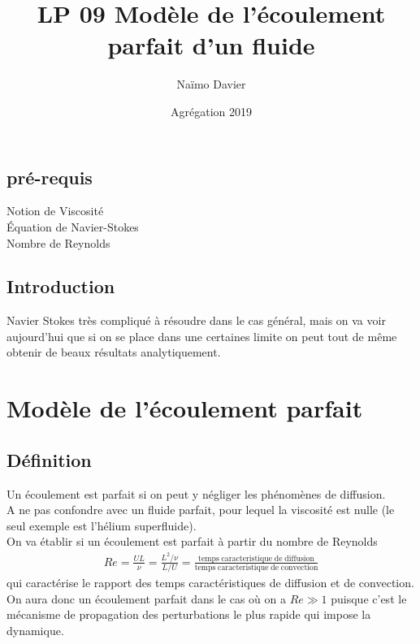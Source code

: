 \documentclass[12pt,prb,aps,epsf]{article}
\begin{document}
	
	\title{LP 09 Modèle de l'écoulement parfait d'un fluide}
	\author{Naïmo Davier}
	\date{Agrégation 2019}
	
	\maketitle
	
	\tableofcontents
	
	\pagebreak
	
	
\subsection{pré-requis}
Notion de Viscosité\\
Équation de Navier-Stokes\\
Nombre de Reynolds

\subsection{Introduction}
Navier Stokes très compliqué à résoudre dans le cas général, mais on va voir aujourd'hui que si on se place dans une certaines limite on peut tout de même obtenir de beaux résultats analytiquement.

\section{Modèle de l'écoulement parfait}
\subsection{Définition}
Un écoulement est parfait si on peut y négliger les phénomènes de diffusion.\\
A ne pas confondre avec un fluide parfait, pour lequel la viscosité est nulle (le seul exemple est l'hélium superfluide).\\
On va établir si un écoulement est parfait à partir du nombre de Reynolds
\begin{eqnarray}
Re = \frac{UL}{\nu} = \frac{L^2/\nu}{L/U} = \frac{\mathrm{temps\;caracteristique\;de\; diffusion}}{\mathrm{temps\;caracteristique\;de\;convection}}
\end{eqnarray}
qui caractérise le rapport des temps caractéristiques de diffusion et de convection. On aura donc un écoulement parfait dans le cas où on a $Re\gg1$ puisque c'est le mécanisme de propagation des perturbations le plus rapide qui impose la dynamique.
\end{document}
